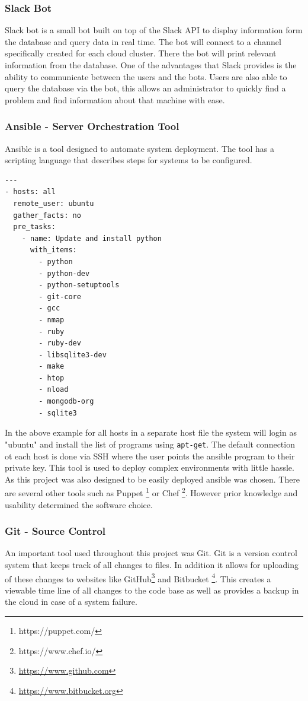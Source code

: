 \documentclass[12pt]{article}
\begin{document}
\subsubsection{Slack Bot}
Slack bot is a small bot built on top of the Slack API to display information form the database and query data in real time. The bot will connect to a channel specifically created for each cloud cluster. There the bot will print relevant information from the database. One of the advantages that Slack provides is the ability to communicate between the users and the bots. Users are also able to query the database via the bot, this allows an administrator to quickly find a problem and find information about that machine with ease.

\subsubsection{Ansible - Server Orchestration Tool}
Ansible is a tool designed to automate system deployment. The tool has a scripting language that describes steps for systems to be configured.
\newpage
\begin{mdframed}
\begin{lstlisting}
---
- hosts: all
  remote_user: ubuntu
  gather_facts: no
  pre_tasks:
    - name: Update and install python
      with_items:
        - python
        - python-dev
        - python-setuptools
        - git-core
        - gcc
        - nmap
        - ruby
        - ruby-dev
        - libsqlite3-dev
        - make
        - htop
        - nload
        - mongodb-org
        - sqlite3

\end{lstlisting}
\end{mdframed}

In the above example for all hosts in a separate host file the system will login as "ubuntu" and install the list of programs using \texttt{apt-get}. The default connection ot each host is done via SSH where the user points the ansible program to their private key.  This tool is used to deploy complex environments with little hassle.  As this project was also designed to be easily deployed ansible was chosen. There are several other tools such as Puppet \footnote{https://puppet.com/} or Chef \footnote{https://www.chef.io/}. However prior knowledge and usability determined the software choice.

\subsubsection{Git - Source Control}
An important tool used throughout this project was Git. Git is a version control system that keeps track of all changes to files. In addition it allows for uploading of these changes to websites like GitHub\footnote{\href{https://www.github.com}{https://www.github.com}} and Bitbucket \footnote{\href{https://www.bitbucket.org}{https://www.bitbucket.org}}. This creates a viewable time line of all changes to the code base as well as provides a backup in the cloud in case of a system failure.
\end{document}
